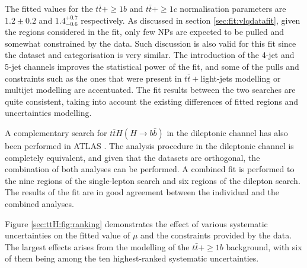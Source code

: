 The fitted values for the $t\bar{t}+\ge1b$ and $t\bar{t}+\ge1c$ normalisation parameters are $1.2\pm0.2$ and $1.4^{+0.7}_{-0.6}$ respectively.
As discussed in section \ref{sec:fit:vlqdatafit}, given the regions considered in the fit, only few NPs are expected to be pulled and somewhat constrained by the data. Such discussion is also valid for this fit since the dataset and categorisation is very similar. The introduction of the 4-jet and 5-jet channels improves the statistical power of the fit, and some of the pulls and constraints such as the ones that were present in $t\bar{t}+$light-jets modelling or multijet modelling are accentuated. The fit results between the two searches are quite consistent, taking into account the existing differences of fitted regions and uncertainties modelling. \par
A complementary search for $t\bar{t}H (H \to b\bar{b})$ in the dileptonic channel has also been performed in ATLAS \cite{ATLAS-CONF-2016-080}. The analysis procedure in the dileptonic channel is completely equivalent, and given that the datasets are orthogonal, the combination of both analyses can be performed. A combined fit is performed to the nine regions of the single-lepton search and six regions of the dilepton search. The results of the fit are in good agreement between the individual and the combined analyses.\par
Figure \ref{sec:ttH:fig:ranking} demonstrates the effect of various systematic uncertainties on the fitted value of $\mu$ and the constraints provided by the data. The largest effects arises from the modelling of the $t\bar{t}+\ge1b$ background, with six of them being among the ten highest-ranked systematic uncertainties.


